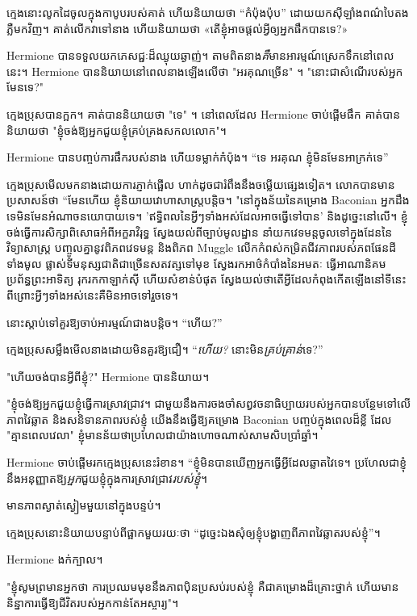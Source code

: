 ក្មេង​នោះ​លូក​ដៃ​ចូល​ក្នុង​កាបូប​របស់​គាត់ ហើយ​និយាយ​ថា “កំប៉ុង​ប៉ុប” ដោយ​យក​ស៊ីឡាំង​ពណ៌​បៃតង​ភ្លឺ​មក​វិញ។ គាត់​លើក​វា​ទៅ​នាង ហើយ​និយាយ​ថា «​តើ​ខ្ញុំ​អាច​ផ្តល់​អ្វី​ឲ្យ​អ្នក​ផឹក​បានទេ​?»

Hermione បានទទួលយកភេសជ្ជៈដ៏ឈ្ងុយឆ្ងាញ់។ តាមពិតនាង\emph{គឺ}មានអារម្មណ៍ស្រេកទឹកនៅពេលនេះ។ Hermione បាននិយាយនៅពេលនាងឡើងលើថា "អរគុណច្រើន" ។ "នោះជាសំណើរបស់អ្នកមែនទេ?"

ក្មេងប្រុសបានក្អក។ គាត់បាននិយាយថា "ទេ" ។ នៅពេលដែល Hermione ចាប់ផ្តើមផឹក គាត់បាននិយាយថា "ខ្ញុំចង់ឱ្យអ្នកជួយខ្ញុំគ្រប់គ្រងសកលលោក"។

Hermione បានបញ្ចប់ការផឹករបស់នាង ហើយទម្លាក់កំប៉ុង។ “ទេ អរគុណ ខ្ញុំមិនមែនអាក្រក់ទេ”

ក្មេង​ប្រុស​មើល​មក​នាង​ដោយ​ការ​ភ្ញាក់​ផ្អើល ហាក់​ដូច​ជា​រំពឹង​នឹង​ចម្លើយ​ផ្សេង​ទៀត។ លោក​បាន​មាន​ប្រសាសន៍​ថា “មែន​ហើយ ខ្ញុំ​និយាយ​វោហាសាស្ត្រ​បន្តិច។ "នៅក្នុងន័យនៃគម្រោង Baconian អ្នកដឹងទេមិនមែនអំណាចនយោបាយទេ។ 'ឥទ្ធិពលនៃអ្វីៗទាំងអស់ដែលអាចធ្វើទៅបាន' និងដូច្នេះនៅលើ។ ខ្ញុំចង់ធ្វើការសិក្សាពិសោធអំពីអក្ខរាវិរុទ្ធ ស្វែងយល់ពីច្បាប់មូលដ្ឋាន នាំយកវេទមន្តចូលទៅក្នុងដែននៃវិទ្យាសាស្ត្រ បញ្ចូលគ្នានូវពិភពវេទមន្ត និងពិភព Muggle លើកកំពស់កម្រិតជីវភាពរបស់ភពផែនដីទាំងមូល ផ្លាស់ទីមនុស្សជាតិជាច្រើនសតវត្សទៅមុខ ស្វែងរកអាថ៌កំបាំងនៃអមតៈ ធ្វើអាណានិគម ប្រព័ន្ធព្រះអាទិត្យ រុករកកាឡាក់ស៊ី ហើយសំខាន់បំផុត ស្វែងយល់ថាតើអ្វីដែលកំពុងកើតឡើងនៅទីនេះ ពីព្រោះអ្វីៗទាំងអស់នេះគឺមិនអាចទៅរួចទេ។

នោះស្តាប់ទៅគួរឱ្យចាប់អារម្មណ៍ជាងបន្តិច។ “ហើយ?”

ក្មេងប្រុសសម្លឹងមើលនាងដោយមិនគួរឱ្យជឿ។ “\emph{ហើយ?} នោះមិន\emph{គ្រប់គ្រាន់}ទេ?”

"ហើយចង់បានអ្វីពីខ្ញុំ?" Hermione បាននិយាយ។

"ខ្ញុំចង់ឱ្យអ្នកជួយខ្ញុំធ្វើការស្រាវជ្រាវ។ ជាមួយនឹងការចងចាំសព្វវចនាធិប្បាយរបស់អ្នកបានបន្ថែមទៅលើភាពវៃឆ្លាត និងសនិទានភាពរបស់ខ្ញុំ យើងនឹងធ្វើឱ្យគម្រោង Baconian បញ្ចប់ក្នុងពេលដ៏ខ្លី ដែល "គ្មានពេលវេលា" ខ្ញុំមានន័យថាប្រហែលជាយ៉ាងហោចណាស់សាមសិបប្រាំឆ្នាំ។

Hermione ចាប់ផ្តើមរកក្មេងប្រុសនេះរំខាន។ “ខ្ញុំមិនបានឃើញអ្នកធ្វើអ្វីដែលឆ្លាតវៃទេ។ ប្រហែលជាខ្ញុំនឹងអនុញ្ញាតឱ្យ\emph{អ្នក}ជួយខ្ញុំក្នុងការស្រាវជ្រាវ\emph{របស់ខ្ញុំ}។

មាន​ភាព​ស្ងាត់​ស្ងៀម​មួយ​នៅ​ក្នុង​បន្ទប់។

ក្មេង​ប្រុស​នោះ​និយាយ​បន្ទាប់​ពី​ផ្អាក​មួយ​រយៈ​ថា “ដូច្នេះ​ឯង​សុំ​ឲ្យ​ខ្ញុំ​បង្ហាញ​ពី​ភាព​វៃ​ឆ្លាត​របស់​ខ្ញុំ”។

Hermione ងក់ក្បាល។

"ខ្ញុំសូមព្រមានអ្នកថា ការប្រឈមមុខនឹងភាពប៉ិនប្រសប់របស់ខ្ញុំ គឺជាគម្រោងដ៏គ្រោះថ្នាក់ ហើយមាននិន្នាការធ្វើឱ្យជីវិតរបស់អ្នកកាន់តែអស្ចារ្យ"។

